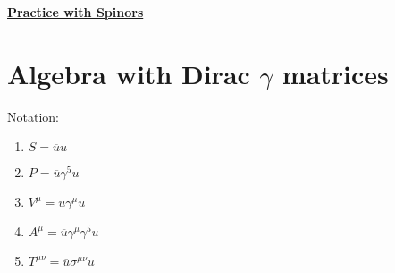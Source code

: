 \documentclass[12pt]{article}
\def \ou{\overline{u}}
\def \ga{\gamma}
\def \si{\sigma}
\begin{document}
\begin{center}
\underline{\textbf{\Large Practice with Spinors}}
\end{center}

\section{Algebra with Dirac $\ga$ matrices}

Notation:
\begin{enumerate} \itemsep=-15pt
\item $S= \ou u$\\
\item $P=\ou \ga^5 u$ \\
\item $V^\mu = \ou \ga^\mu u$ \\
\item $A^\mu = \ou \ga^\mu \ga^5 u $ \\
\item $T^{\mu\nu} = \ou \si^{\mu\nu} u$
\end{enumerate}
\bigskip
\end{document}
